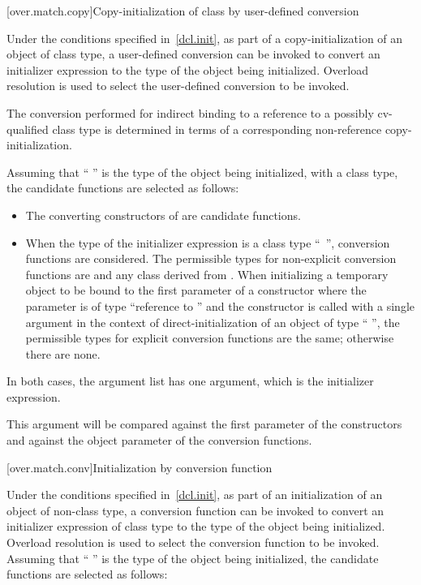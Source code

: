 [over.match.copy]{Copy-initialization of class by user-defined conversion}%

\pnum
Under the conditions specified in~\ref{dcl.init}, as
part of a copy-initialization of an object of class type, a user-defined
conversion can be invoked to convert an initializer expression to the
type of the object being initialized.
Overload resolution is used
to select the user-defined conversion to be invoked.
\begin{note}
The conversion performed for indirect binding to a reference to a possibly
cv-qualified class type is determined in terms of a corresponding non-reference
copy-initialization.
\end{note}
Assuming that
`` '' is the type of the object being initialized, with
a class type,
the candidate functions are selected as follows:

\begin{itemize}
\item
The converting constructors of
are candidate functions.
\item
When the type of the initializer expression is a class type
``\cv{}~'',
conversion functions are considered.
The permissible types for non-explicit conversion functions are
 and any class derived from .
When initializing a temporary object
to be bound to the first parameter of a constructor
where the parameter is of type
``reference to  ''
and the constructor is
called with a single argument in the context of
direct-initialization of an object of type `` '',
the permissible types for explicit conversion functions are the same;
otherwise there are none.
\end{itemize}

\pnum
In both cases, the argument list has one argument, which is the initializer
expression.
\begin{note}
This argument will be compared against
the first parameter of the constructors and against the
object parameter of the conversion functions.
\end{note}

[over.match.conv]{Initialization by conversion function}%

\pnum
Under the conditions specified in~\ref{dcl.init}, as
part of an initialization of an object of non-class type,
a conversion function can be invoked to convert an initializer
expression of class type to the type of the object
being initialized.
Overload resolution is used to select the
conversion function to be invoked.
Assuming that ``\cv{} '' is the
type of the object being initialized,
the candidate functions are selected as follows:

